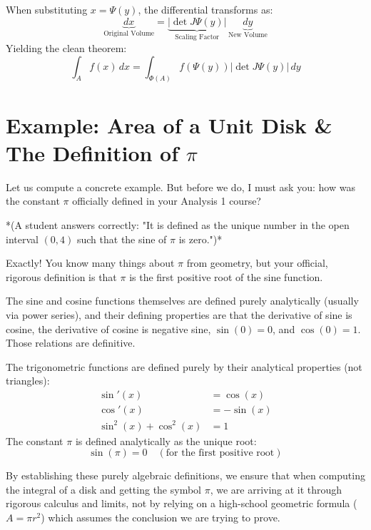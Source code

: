 \begin{orangeformula}
\begin{theorem}
When substituting $x = \Psi(y)$, the differential transforms as:
\[
\underbrace{dx}_{\text{Original Volume}} = \underbrace{|\det J\Psi(y)|}_{\text{Scaling Factor}} \, \underbrace{dy}_{\text{New Volume}}
\]
Yielding the clean theorem:
\[
\int_A f(x) \, dx = \int_{\Phi(A)} f(\Psi(y)) |\det J\Psi(y)| \, dy
\]
\end{theorem}
\end{orangeformula}

\section{Example: Area of a Unit Disk \& The Definition of $\pi$}

\begin{spoken_clean}[00:12:15 - 00:15:00]
Let us compute a concrete example. But before we do, I must ask you: how was the constant $\pi$ officially defined in your Analysis 1 course? 

*(A student answers correctly: "It is defined as the unique number in the open interval $(0, 4)$ such that the sine of $\pi$ is zero.")*

Exactly! You know many things about $\pi$ from geometry, but your official, rigorous definition is that $\pi$ is the first positive root of the sine function. 

The sine and cosine functions themselves are defined purely analytically (usually via power series), and their defining properties are that the derivative of sine is cosine, the derivative of cosine is negative sine, $\sin(0) = 0$, and $\cos(0) = 1$. Those relations are definitive.
\end{spoken_clean}

\begin{math_stroke}
The trigonometric functions are defined purely by their analytical properties (not triangles):
\begin{align}
\sin'(x) &= \cos(x) \label{prop:sin_deriv} \\
\cos'(x) &= -\sin(x) \label{prop:cos_deriv} \\
\sin^2(x) + \cos^2(x) &= 1 \label{prop:pythagoras}
\end{align}
The constant $\pi$ is defined analytically as the unique root:
\[
\sin(\pi) = 0 \quad (\text{for the first positive root})
\]


\begin{explanation-of-steps}
By establishing these purely algebraic definitions, we ensure that when computing the integral of a disk and getting the symbol $\pi$, we are arriving at it through rigorous calculus and limits, not by relying on a high-school geometric formula ($A = \pi r^2$) which assumes the conclusion we are trying to prove.
\end{explanation-of-steps}
\end{math_stroke}

